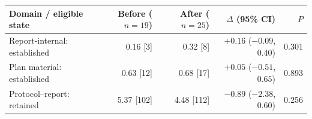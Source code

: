 \begin{tabularx}{\linewidth}{@{}Yrrrr@{}}
\toprule
Domain / eligible state & Before ($n=19$) & After ($n=25$) & $\Delta$ (95\% CI) & $P$ \\
\midrule
Report-internal: established & 0.16 [3] & 0.32 [8] & $+0.16$ ($-0.09$, $0.40$) & 0.301 \\
Plan material: established & 0.63 [12] & 0.68 [17] & $+0.05$ ($-0.51$, $0.65$) & 0.893 \\
Protocol--report: retained & 5.37 [102] & 4.48 [112] & $-0.89$ ($-2.38$, $0.60$) & 0.256 \\
\bottomrule
\end{tabularx}
